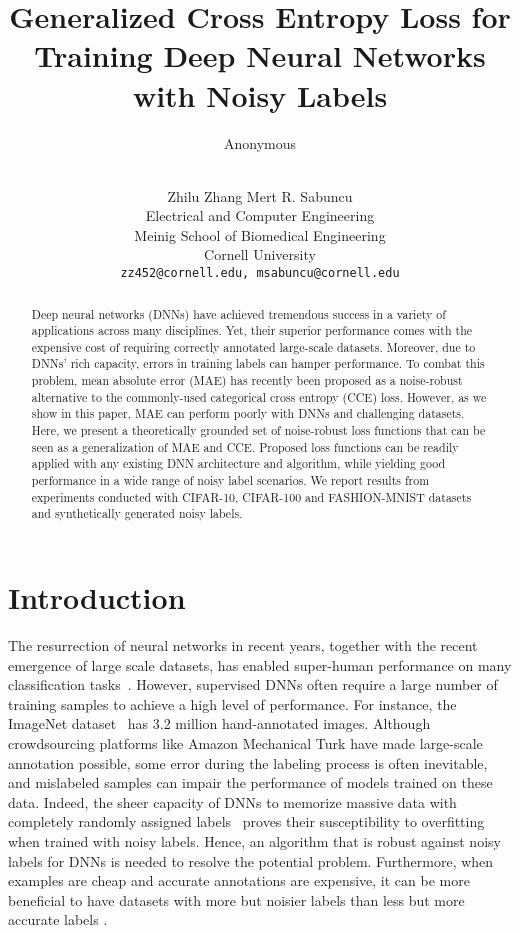 \documentclass{article}
\title{Generalized Cross Entropy Loss for Training Deep Neural Networks with Noisy Labels}
\author{Anonymous \\
 \\
}
\author{
 Zhilu Zhang \qquad  Mert R. Sabuncu \\
 Electrical and Computer Engineering\\
 Meinig School of Biomedical Engineering \\
 Cornell University\\
 \texttt{zz452@cornell.edu, msabuncu@cornell.edu} \\
}
\begin{document}
\maketitle

\begin{abstract}
Deep neural networks (DNNs) have achieved tremendous success in a variety of applications across many disciplines. 
Yet, their superior performance comes with the expensive cost of requiring correctly annotated large-scale datasets. 
Moreover, due to DNNs' rich capacity, errors in training labels can hamper performance. 
To combat this problem, mean absolute error (MAE) has recently been proposed as a noise-robust alternative to the commonly-used categorical cross entropy (CCE) loss. 
However, as we show in this paper, MAE can perform poorly with DNNs and challenging datasets.
Here, we present a theoretically grounded set of noise-robust loss functions that can be seen as a generalization of MAE and CCE. 
Proposed loss functions can be readily applied with any existing DNN architecture and algorithm, while yielding good performance in a wide range of noisy label scenarios. 
We report results from experiments conducted with CIFAR-10, CIFAR-100 and FASHION-MNIST datasets and synthetically generated noisy labels. 
\end{abstract}

\section{Introduction}
The resurrection of neural networks in recent years, together with the recent emergence of large scale datasets, has enabled super-human performance on many classification tasks~\cite{krizhevsky2012imagenet, mnih2015human, noh2015learning}. 
However, supervised DNNs often require a large number of training samples to achieve a high level of performance. 
For instance, the ImageNet dataset~\cite{deng2009imagenet} has 3.2 million hand-annotated images. 
Although crowdsourcing platforms like Amazon Mechanical Turk have made large-scale annotation possible, some error during the labeling process is often inevitable, and mislabeled samples can impair the performance of models trained on these data. 
Indeed, the sheer capacity of DNNs to memorize massive data with completely randomly assigned labels~\cite{zhang2016understanding} proves their susceptibility to overfitting when trained with noisy labels. 
Hence, an algorithm that is robust against noisy labels for DNNs is needed to resolve the potential problem.
Furthermore, when examples are cheap and accurate annotations are expensive, it can be more beneficial to have datasets with more but noisier labels than less but more accurate labels \cite{khetan2017learning}. 
\end{document}
